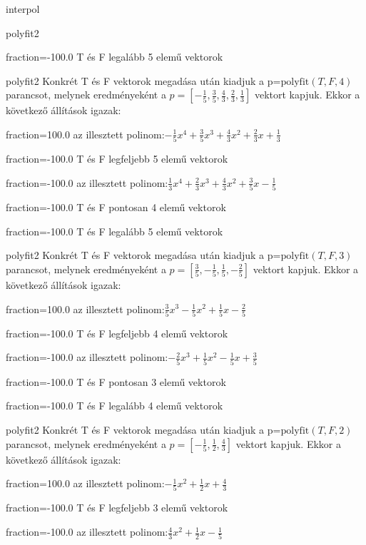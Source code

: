 \documentclass[12pt]{article}
\begin{document}
\begin{quiz}{interpol}
\begin{multi}[multiple]{polyfit2}
\item[fraction=-100.0] T és F legalább 5 elemű vektorok
\end{multi}
\begin{multi}[multiple]{polyfit2}
Konkrét T és F vektorok megadása után kiadjuk a p=$\mathrm{polyfit}(T,F,4)$
parancsot, melynek eredményeként a $p=\left[-\frac{1}{5},\frac{3}{5},\frac{4}{3},\frac{2}{3},\frac{1}{3}\right]$ vektort kapjuk.
Ekkor a következő állítások igazak:
\item[fraction=100.0] az illesztett polinom:$-\frac{1}{5}x^4+\frac{3}{5}x^3+\frac{4}{3}x^2+\frac{2}{3}x+\frac{1}{3}$
\item[fraction=-100.0]  T és F legfeljebb 5 elemű vektorok
\item[fraction=-100.0]  az illesztett polinom:$\frac{1}{3}x^4+\frac{2}{3}x^3+\frac{4}{3}x^2+\frac{3}{5}x-\frac{1}{5}$
\item[fraction=-100.0]  T és F pontosan 4 elemű vektorok
\item[fraction=-100.0] T és F legalább 5 elemű vektorok
\end{multi}
\begin{multi}[multiple]{polyfit2}
Konkrét T és F vektorok megadása után kiadjuk a p=$\mathrm{polyfit}(T,F,3)$
parancsot, melynek eredményeként a $p=\left[\frac{3}{5},-\frac{1}{5},\frac{1}{5},-\frac{2}{5}\right]$ vektort kapjuk.
Ekkor a következő állítások igazak:
\item[fraction=100.0] az illesztett polinom:$\frac{3}{5}x^3-\frac{1}{5}x^2+\frac{1}{5}x-\frac{2}{5}$
\item[fraction=-100.0]  T és F legfeljebb 4 elemű vektorok
\item[fraction=-100.0]  az illesztett polinom:$-\frac{2}{5}x^3+\frac{1}{5}x^2-\frac{1}{5}x+\frac{3}{5}$
\item[fraction=-100.0]  T és F pontosan 3 elemű vektorok
\item[fraction=-100.0] T és F legalább 4 elemű vektorok
\end{multi}
\begin{multi}[multiple]{polyfit2}
Konkrét T és F vektorok megadása után kiadjuk a p=$\mathrm{polyfit}(T,F,2)$
parancsot, melynek eredményeként a $p=\left[-\frac{1}{5},\frac{1}{2},\frac{4}{3}\right]$ vektort kapjuk.
Ekkor a következő állítások igazak:
\item[fraction=100.0] az illesztett polinom:$-\frac{1}{5}x^2+\frac{1}{2}x+\frac{4}{3}$
\item[fraction=-100.0]  T és F legfeljebb 3 elemű vektorok
\item[fraction=-100.0]  az illesztett polinom:$\frac{4}{3}x^2+\frac{1}{2}x-\frac{1}{5}$

\end{multi}
\end{quiz}
\end{document}
